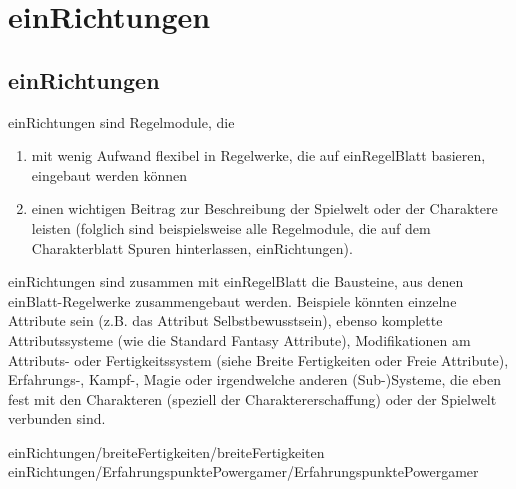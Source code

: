\part {einRichtungen}
\chapter {einRichtungen}
einRichtungen sind Regelmodule, die
\begin{enumerate}
\item mit wenig Aufwand flexibel in Regelwerke, die auf einRegelBlatt basieren, eingebaut werden können
\item einen wichtigen Beitrag zur Beschreibung der Spielwelt oder der Charaktere leisten (folglich sind beispielsweise alle Regelmodule, die auf dem Charakterblatt Spuren hinterlassen, einRichtungen).
\end{enumerate}
einRichtungen sind zusammen mit einRegelBlatt die Bausteine, aus denen einBlatt-Regelwerke zusammengebaut werden.
Beispiele könnten einzelne Attribute sein (z.B. das Attribut Selbstbewusstsein), ebenso komplette Attributssysteme (wie die Standard Fantasy Attribute), Modifikationen am Attributs- oder Fertigkeitssystem (siehe Breite Fertigkeiten oder Freie Attribute), Erfahrungs-, Kampf-, Magie oder irgendwelche anderen (Sub-)Systeme, die eben fest mit den Charakteren (speziell der Charaktererschaffung) oder der Spielwelt verbunden sind.

 {einRichtungen/breiteFertigkeiten/breiteFertigkeiten}
 {einRichtungen/ErfahrungspunktePowergamer/ErfahrungspunktePowergamer}
